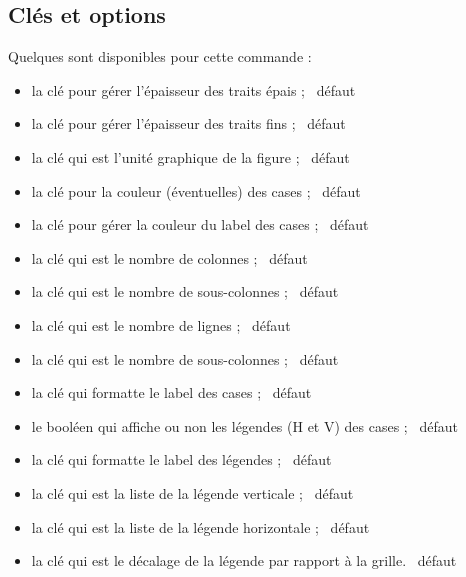 \subsection{Clés et options}

\begin{cautionblock}
Quelques  sont disponibles pour cette commande :

\begin{itemize}
	\item la clé  pour gérer l'épaisseur des traits épais ; \hfill~défaut \Cle{1.5pt}
	\item la clé  pour gérer l'épaisseur des traits fins ; \hfill~défaut \Cle{0.5pt}
	\item la clé  qui est l'unité graphique de la figure ; \hfill~défaut \Cle{1cm}
	\item la clé  pour la couleur (éventuelles) des cases ; \hfill~défaut 
	\item la clé  pour gérer la couleur du label des cases ; \hfill~défaut 
	\item la clé  qui est le nombre de colonnes ; \hfill~défaut 
	\item la clé  qui est le nombre de sous-colonnes ; \hfill~défaut 
	\item la clé  qui est le nombre de lignes ; \hfill~défaut 
	\item la clé  qui est le nombre de sous-colonnes ; \hfill~défaut 
	\item la clé  qui formatte le label des cases ; \hfill~défaut 
	\item le booléen  qui affiche ou non les légendes (H et V) des cases ; \hfill~défaut 
	\item la clé  qui formatte le label des légendes ; \hfill~défaut 
	\item la clé  qui est la liste de la légende verticale ; \hfill~défaut 
	\item la clé  qui est la liste de la légende horizontale ; \hfill~défaut 
	\item la clé  qui est le décalage de la légende par rapport à la grille. \hfill~défaut 
\end{itemize}
\vspace*{-\baselineskip}\leavevmode
\end{cautionblock}

